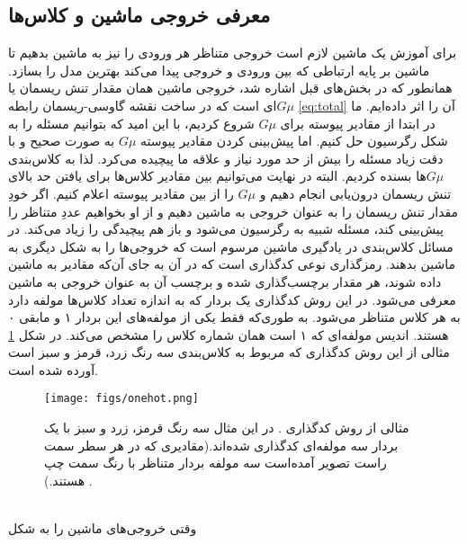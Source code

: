 \subsection{ معرفی خروجی ماشین و کلاس‌ها}
\label{subsec:output_prep}
برای آموزش یک ماشین لازم است خروجی متناظر هر ورودی را نیز به ماشین بدهیم تا ماشین بر پایه ارتباطی که بین ورودی و خروجی پیدا می‌کند بهترین مدل را بسازد. همانطور که در بخش‌های قبل اشاره شد، خروجی ماشین همان مقدار تنش ریسمان یا $G\mu$ای است که در ساخت نقشه گاوسی-ریسمان رابطه   
\ref{eq:total}
آن را اثر داده‌ایم. ما در ابتدا از مقادیر پیوسته برای $G\mu$ شروع کردیم، با این امید که بتوانیم مسئله را به شکل رگرسیون حل کنیم. اما پیش‌بینی کردن مقادیر پیوسته  $G\mu$ به صورت صحیح و با دقت زیاد مسئله را بیش از حد مورد نیاز و علاقه ما پیچیده می‌کرد. لذا به کلاس‌بندی  $G\mu$ها بسنده کردیم. البته در نهایت می‌توانیم بین مقادیر کلاس‌ها برای یافتن حد بالای تنش‌ ریسمان درون‌یابی انجام دهیم و  $G\mu$ را از بین مقادیر پیوسته اعلام کنیم. اگر خودِ مقدار تنش ریسمان را به عنوان خروجی به ماشین دهیم و از او بخواهیم عددِ متناظر را پیش‌بینی کند، مسئله شبیه به رگرسیون می‌شود و باز هم پیچیدگی را زیاد می‌کند. در مسائل کلاس‌بندی در یادگیری ماشین مرسوم است که خروجی‌ها را به شکل دیگری به ماشین بدهند. رمزگذاری
نوعی کدگذاری است که در آن به جای آن‌که مقادیر به ماشین داده شوند، هر مقدار برچسب‌گذاری شده و برچسب آن به عنوان    خروجی به ماشین معرفی می‌شود. در این روش کدگذاری یک بردار که به اندازه تعداد کلاس‌ها مولفه دارد به هر کلاس متناظر می‌شود. به طوری‌که فقط یکی از مولفه‌های این بردار ۱ و مابقی ۰ هستند. اندیس مولفه‌ای که ۱ است همان شماره کلاس را مشخص می‌کند. در شکل 
\ref{fig:onehot}
مثالی از این روش کدگذاری که مربوط به کلاس‌بندی سه رنگ زرد، قرمز و سبز است آورده شده است.
\begin{figure}
	\begin{center}
		\texttt{[image: figs/onehot.png]}
	\end{center}
	\caption[
	مثالی از روش کدگذاری
	. در این مثال سه رنگ قرمز، زرد و سبز با یک بردار سه مولفه‌ای کدگذاری شده‌اند.(مقادیری که در هر سطر سمت راست تصویر آمده‌است سه مولفه بردار متناظر با رنگ سمت چپ هستند.) 
	]{مثالی از روش کدگذاری
		. در این مثال سه رنگ قرمز، زرد و سبز با یک بردار سه مولفه‌ای کدگذاری شده‌اند.(مقادیری که در هر سطر سمت راست تصویر آمده‌است سه مولفه بردار متناظر با رنگ سمت چپ هستند.)  
	\footnotemark.}
	\label{fig:onehot}
\end{figure}   
\\
وقتی خروجی‌های ماشین را به شکل 
